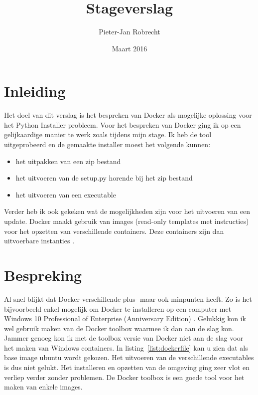 \documentclass{article}
\title{Stageverslag}
\author{\mbox{Pieter-Jan} Robrecht}
\date{Maart 2016}
\begin{document}


\clearpage
\setcounter{page}{1}

\tableofcontents
\lstlistoflistings
\clearpage

\section{Inleiding}
Het doel van dit verslag is het bespreken van Docker als mogelijke oplossing voor het Python Installer probleem.
Voor het bespreken van Docker ging ik op een gelijkaardige manier te werk zoals tijdens mijn stage.
Ik heb de tool uitgeprobeerd en de gemaakte installer moest het volgende kunnen:
\begin{itemize}
\item het uitpakken van een zip bestand
\item het uitvoeren van de setup.py horende bij het zip bestand
\item het uitvoeren van een executable
\end{itemize}
Verder heb ik ook gekeken wat de mogelijkheden zijn voor het uitvoeren van een update.
Docker maakt gebruik van images (read-only templates met instructies) voor het opzetten van verschillende containers.
Deze containers zijn dan uitvoerbare instanties \citep{docker}.

\section{Bespreking}
Al snel blijkt dat Docker verschillende plus- maar ook minpunten heeft.
Zo is het bijvoorbeeld enkel mogelijk om Docker te installeren op een computer met Windows 10 Professional of Enterprise (Anniversary Edition) \citep{microsoft}.
Gelukkig kon ik wel gebruik maken van de Docker toolbox waarmee ik dan aan de slag kon.
Jammer genoeg kon ik met de toolbox versie van Docker niet aan de slag voor het maken van Windows containers.
In listing~\vref{list:dockerfile} kan u zien dat als base image ubuntu wordt gekozen.
Het uitvoeren van de verschillende executables is dus niet gelukt.
Het installeren en opzetten van de omgeving ging zeer vlot en verliep verder zonder problemen.
De Docker toolbox is een goede tool voor het maken van enkele images.




%

\end{document}
